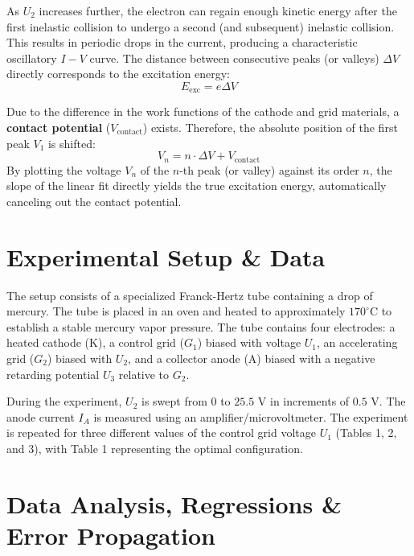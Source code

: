 \documentclass[a4paper,11pt]{article}
\begin{document}
As $U_2$ increases further, the electron can regain enough kinetic energy after the first inelastic collision to undergo a second (and subsequent) inelastic collision. This results in periodic drops in the current, producing a characteristic oscillatory $I-V$ curve. The distance between consecutive peaks (or valleys) $\Delta V$ directly corresponds to the excitation energy:
\begin{equation}
    E_{\text{exc}} = e \Delta V
\end{equation}

Due to the difference in the work functions of the cathode and grid materials, a \textbf{contact potential} ($V_{\text{contact}}$) exists. Therefore, the absolute position of the first peak $V_1$ is shifted:
\begin{equation}
    V_n = n \cdot \Delta V + V_{\text{contact}}
\end{equation}
By plotting the voltage $V_n$ of the $n$-th peak (or valley) against its order $n$, the slope of the linear fit directly yields the true excitation energy, automatically canceling out the contact potential.

\section{Experimental Setup \& Data}
The setup consists of a specialized Franck-Hertz tube containing a drop of mercury. The tube is placed in an oven and heated to approximately $170^\circ\text{C}$ to establish a stable mercury vapor pressure. The tube contains four electrodes: a heated cathode (K), a control grid ($G_1$) biased with voltage $U_1$, an accelerating grid ($G_2$) biased with $U_2$, and a collector anode (A) biased with a negative retarding potential $U_3$ relative to $G_2$.

During the experiment, $U_2$ is swept from $0$ to $25.5\text{ V}$ in increments of $0.5\text{ V}$. The anode current $I_A$ is measured using an amplifier/microvoltmeter. The experiment is repeated for three different values of the control grid voltage $U_1$ (Tables 1, 2, and 3), with Table 1 representing the optimal configuration.

\section{Data Analysis, Regressions \& Error Propagation}
\end{document}

